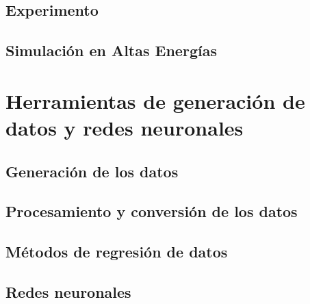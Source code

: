 \documentclass[12pt]{report}
\begin{document}
	\section{Experimento \CMS}\label{Experimento_CMS}
	

		
	\section{Simulación en Altas Energías}
	
	
	


\chapter{Herramientas de generación de datos y redes neuronales}


	\section{Generación de los datos}\label{Cap_genera}
    

    \section{Procesamiento y conversión de los datos}
    
    
    \section{Métodos de regresión de datos}\label{Cap_regresion}
    
    
    \section{Redes neuronales}
    
\end{document}

